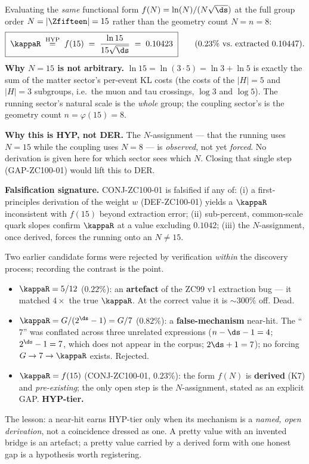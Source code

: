 \documentclass[12pt, a4paper]{article}
\begin{document}
\begin{formalbox}[title={CONJ-ZC100-01 (HYP, NOT a result): $\kappaR$ as the
  $N=15$ reading of the K7 form}]
Evaluating the \emph{same} functional form $f(N)=\ln(N)/(N\sqrt{\ds})$ at the
full group order $N=|\Zfifteen|=15$ rather than the geometry count $N=n=8$:
\[
  \boxed{\;\kappaR \;\stackrel{\mathrm{HYP}}{=}\;
     f(15)\;=\;\frac{\ln 15}{15\sqrt{\ds}}
     \;=\; 0.10423\;}
  \qquad (0.23\%\ \text{vs.\ extracted } 0.10447).
\]
\textbf{Why $N=15$ is not arbitrary.} $\ln 15=\ln(3\cdot5)=\ln 3+\ln 5$ is
exactly the sum of the matter sector's per-event KL costs (the costs of the
$|H|=5$ and $|H|=3$ subgroups, i.e.\ the muon and tau crossings, $\log 3$ and
$\log 5$). The running sector's natural scale is the \emph{whole} group; the
coupling sector's is the geometry count $n=\varphi(15)=8$.

\textbf{Why this is HYP, not DER.} The $N$-assignment --- that the running uses
$N=15$ while the coupling uses $N=8$ --- is \emph{observed}, not yet
\emph{forced}. No derivation is given here for which sector sees which $N$.
Closing that single step (GAP-ZC100-01) would lift this to DER.

\textbf{Falsification signature.} CONJ-ZC100-01 is falsified if any of:
(i) a first-principles derivation of the weight $w$ (DEF-ZC100-01) yields a
$\kappaR$ inconsistent with $f(15)$ beyond extraction error; (ii) sub-percent,
common-scale quark slopes confirm $\kappaR$ at a value excluding $0.1042$;
(iii) the $N$-assignment, once derived, forces the running onto an $N\neq15$.
\end{formalbox}

\begin{derivedbox}[title={Why CONJ-ZC100-01 is a different kind of object than
  the rejected candidates (PM-COUNCIL-01)}]
Two earlier candidate forms were rejected by verification \emph{within} the
discovery process; recording the contrast is the point.
\begin{itemize}[leftmargin=1.6em, noitemsep]
  \item $\kappaR=5/12$ ($0.22\%$): an \textbf{artefact} of the ZC99 v1
    extraction bug --- it matched $4\times$ the true $\kappaR$. At the correct
    value it is $\sim300\%$ off. Dead.
  \item $\kappaR=G/(2^{\ds}-1)=G/7$ ($0.82\%$): a \textbf{false-mechanism}
    near-hit. The ``$7$'' was conflated across three unrelated expressions
    ($n-\ds-1=4$; $2^{\ds}-1=7$, which does not appear in the corpus;
    $2\ds+1=7$); no forcing $G\to7\to\kappaR$ exists. Rejected.
  \item $\kappaR=f(15)$ (CONJ-ZC100-01, $0.23\%$): the form $f(N)$ is
    \textbf{derived} (K7) and \emph{pre-existing}; the only open step is the
    $N$-assignment, stated as an explicit GAP. \textbf{HYP-tier.}
\end{itemize}
The lesson: a near-hit earns HYP-tier only when its mechanism is a \emph{named,
open derivation}, not a coincidence dressed as one. A pretty value with an
invented bridge is an artefact; a pretty value carried by a derived form with
one honest gap is a hypothesis worth registering.
\end{derivedbox}
\end{document}
